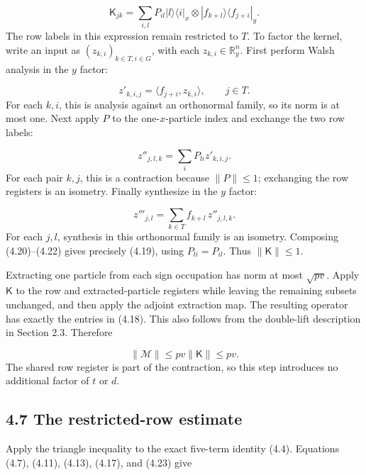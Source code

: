 \documentclass[11pt,a4paper]{article}
\begin{document}
\begin{equation}
\mathsf K_{jk}=\sum_{i,l}P_{il}
|l\rangle\langle i|_x\otimes
|f_{k+l}\rangle\langle f_{j+i}|_y.
\tag{4.19}
\end{equation}
The row labels in this expression remain restricted to \(T\). To factor the kernel, write an input as \((z_{k,i})_{k\in T,i\in G}\), with each \(z_{k,i}\in\mathbb R^n_y\). First perform Walsh analysis in the \(y\) factor:

\begin{equation}
z'_{k,i,j}=\langle f_{j+i},z_{k,i}\rangle,
\qquad j\in T.
\tag{4.20}
\end{equation}
For each \(k,i\), this is analysis against an orthonormal family, so its norm is at most one. Next apply \(P\) to the one-\(x\)-particle index and exchange the two row labels:

\begin{equation}
z''_{j,l,k}=\sum_i P_{li}z'_{k,i,j}.
\tag{4.21}
\end{equation}
For each pair \(k,j\), this is a contraction because \(\|P\|\le1\); exchanging the row registers is an isometry. Finally synthesize in the \(y\) factor:

\begin{equation}
z'''_{j,l}=\sum_{k\in T}f_{k+l}\,z''_{j,l,k}.
\tag{4.22}
\end{equation}
For each \(j,l\), synthesis in this orthonormal family is an isometry. Composing (4.20)--(4.22) gives precisely (4.19), using \(P_{li}=P_{il}\). Thus \(\|\mathsf K\|\le1\).

Extracting one particle from each sign occupation has norm at most \(\sqrt{pv}\). Apply \(\mathsf K\) to the row and extracted-particle registers while leaving the remaining subsets unchanged, and then apply the adjoint extraction map. The resulting operator has exactly the entries in (4.18). This also follows from the double-lift description in Section 2.3. Therefore

\begin{equation}
\|\mathcal M\|\le pv\|\mathsf K\|\le pv.
\tag{4.23}
\end{equation}
The shared row register is part of the contraction, so this step introduces no additional factor of \(t\) or \(d\).

\subsection*{4.7 The restricted-row estimate}
Apply the triangle inequality to the exact five-term identity (4.4). Equations (4.7), (4.11), (4.13), (4.17), and (4.23) give
\end{document}
